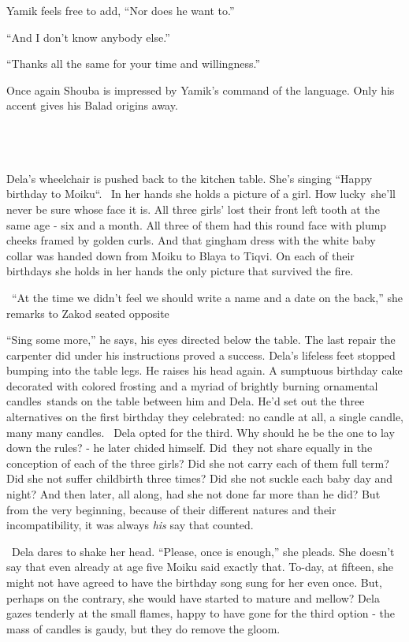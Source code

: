 \documentclass[twoside,11pt]{book}
\begin{document}
Yamik feels free to add, ``Nor does he want to.''

``And I don't know anybody else.''

``Thanks all the same for your time and willingness.''

Once again Shouba is impressed by Yamik's command of the language. Only his accent gives his Balad origins away.

~

\chapter{}

Dela's wheelchair is pushed back to the kitchen table. She's singing ``Happy birthday to
Moiku``. ~In her hands she holds a picture of a girl. How lucky~she'll never be sure whose face it is. All
three girls' lost their front left tooth at the same age - six and a month. All three of them had this round face with
plump cheeks framed by golden curls. And that gingham dress with the white baby collar was handed down from Moiku to
Blaya to Tiqvi. On each of their birthdays she holds in her hands the only picture that survived the fire.

\ ``At the time we didn't feel we should write a name and a date on the back,'' she remarks to
Zakod seated opposite

``Sing some more,'' he says, his eyes directed below the table. The last repair the carpenter
did under his instructions proved a success. Dela's lifeless feet stopped bumping into the table legs. He raises his
head again. A sumptuous birthday cake decorated with colored frosting and a myriad of brightly burning ornamental
candles~stands on the table between him and Dela. He'd set out the three alternatives on the first birthday they
celebrated: no candle at all, a single candle, many many candles.~ Dela opted for the third. Why should he be the one
to lay down the rules? - he later chided himself. Did~they not share equally in the conception of each of the three
girls? Did she not carry each of them full term? Did she not suffer childbirth three times? Did she not suckle each
baby day and night? And then later, all along, had she not done far more than he did? But from the very beginning,
because of their different natures and their incompatibility, it was always \textit{his} say that counted.

~Dela dares to shake her head. ``Please, once is enough,'' she pleads. She doesn't say that
even already at age five Moiku said exactly that. To-day, at fifteen, she might not have agreed to have the birthday
song sung for her even once. But, perhaps on the contrary, she would have started to mature and mellow? Dela gazes
tenderly at the small flames, happy to have gone for the third option - the mass of candles is gaudy, but they do
remove the gloom.
\end{document}
